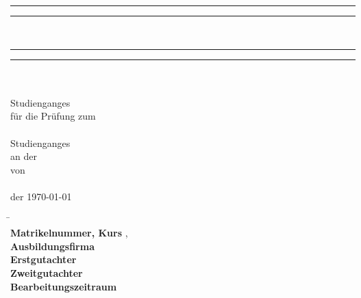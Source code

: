 \begin{titlepage}
	\thispagestyle{empty}
    \begin{center}
        \rule{\textwidth}{1.6pt}\vspace*{-\baselineskip}\vspace*{2pt}
        \rule{\textwidth}{0.4pt}
        \\[0.2\baselineskip]
        {\LARGE \myTitle}	
        \rule{\textwidth}{0.4pt}\vspace*{-\baselineskip}\vspace{3.2pt}
        \rule{\textwidth}{1.6pt}
        \\
        \vspace*{12mm}	{\large \myDokumententyp}\\
        \ifx\myBachelorart\undefinde
            \vspace*{27mm}	Studienganges \myStudiengang\\
        \else
            \vspace*{12mm}	für die Prüfung zum\\
            \vspace*{3mm} 	{\large \myBachelorart}\\
            \vspace*{12mm}	Studienganges \myStudiengang\\
        \fi
        \vspace*{3mm} 	an der \myHochschule\\
        \vspace*{12mm}	von\\
        \vspace*{3mm} 	{\large \myStudentenname}\\
        \vspace*{12mm}	{\todaysname} der {\today} \\
      \end{center}

      \vfill
      \begin{spacing}{1.2}
        \centering
        \begin{tabbing}
            \hspace{6.5cm}                   \= \kill\\
            \textbf{Matrikelnummer, Kurs}  \>  \myMatrikelnummer, \myKurs\\
            \textbf{Ausbildungsfirma}      \>  \myAusbildungsfirma\\
            \textbf{Erstgutachter}         \>  \myErstgutachter\\
            \ifx\myZweigutachter\undefined
            \else
            \textbf{Zweitgutachter}        \>  \myZweigutachter\\
            \fi
            \textbf{Bearbeitungszeitraum}  \>  \Bearbeitungszeitraum\\
        \end{tabbing}
      \end{spacing}
\end{titlepage}	